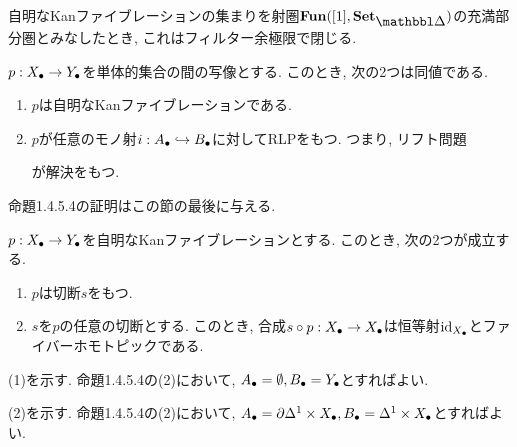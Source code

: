 \documentclass[uplatex, a4paper, 14Q, dvipdfmx]{jsreport}
\begin{document}
\begin{remark}
  自明なKanファイブレーションの集まりを射圏$\fun([1],\sset)$の充満部分圏とみなしたとき, これはフィルター余極限で閉じる. 
\end{remark}

\begin{remark}
  $p: X_\bullet \to Y_\bullet$を単体的集合の間の写像とする. 
  このとき, 次の2つは同値である. 
  \begin{enumerate}
    \item $p$は自明なKanファイブレーションである. 
    \item $p$が任意のモノ射$i: A_\bullet \hookrightarrow B_\bullet$に対してRLPをもつ. 
    つまり, リフト問題
    \begin{center}
    \end{center}
    が解決をもつ. 
  \end{enumerate}
\end{remark}

命題1.4.5.4の証明はこの節の最後に与える. 

\begin{cor}
  $p: X_\bullet \to Y_\bullet$を自明なKanファイブレーションとする. 
  このとき, 次の2つが成立する. 
  \begin{enumerate}
    \item $p$は切断$s$をもつ. 
    \item $s$を$p$の任意の切断とする. 
    このとき, 合成$s \circ p: X_\bullet \to X_\bullet$は恒等射$\mathrm{id}_{X_\bullet}$とファイバーホモトピックである. 
  \end{enumerate}
\end{cor}

\begin{Proof}
  (1)を示す. 
  命題1.4.5.4の(2)において, $A_\bullet=\emptyset, B_\bullet=Y_\bullet$とすればよい. 
  \begin{center}
  \end{center}
  (2)を示す. 
  命題1.4.5.4の(2)において, $A_\bullet=\partial \Delta^1 \times X_\bullet, B_\bullet=\Delta^1 \times X_\bullet$とすればよい. 
\end{Proof}
\end{document}
